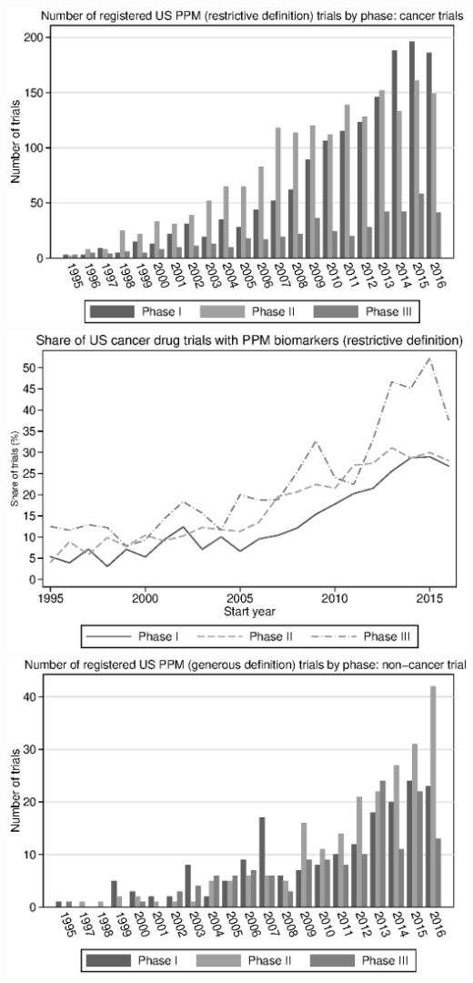 \includegraphics{../figures/A05c-r_ppm_count_by_phase_cancer_us.eps}
\includegraphics{../figures/A05d-r_ppm_share_by_phase_cancer_us.eps}
\includegraphics{../figures/A06a-g_ppm_count_by_phase_noncancer_us.eps}

